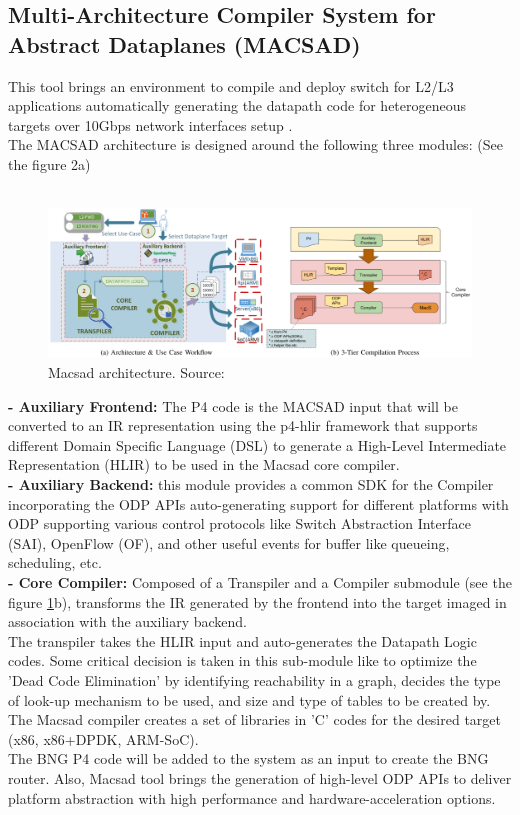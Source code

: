 \subsection{Multi-Architecture Compiler System for Abstract Dataplanes (MACSAD)} 
\label{sec:Macsad}
This tool brings an environment to compile and deploy switch for L2/L3 applications automatically generating the datapath code for heterogeneous targets over 10Gbps network interfaces setup \cite{Patra}.\\
The MACSAD architecture is designed around the following three modules: (See the figure 2a) \\ \\
\begin{figure}[!ht]
	\centering
	\includegraphics[width=0.85\linewidth]{figures/macsad_arch.png}
	\caption{Macsad architecture. Source:\cite{Patra}}
	\label{fig:mac_arch}
\end{figure}

\textbf{- Auxiliary Frontend:} The P4 code is the MACSAD input that will be converted to an IR representation using the  p4-hlir framework that supports different Domain Specific Language (DSL) to generate a High-Level Intermediate Representation (HLIR) to be used in the Macsad core compiler.\\
\textbf{- Auxiliary Backend:} this module provides a common SDK for the Compiler incorporating the ODP APIs 
 auto-generating support for different platforms with ODP supporting various control protocols like Switch Abstraction Interface (SAI), OpenFlow (OF), and other useful events for buffer like queueing, scheduling, etc.\\
\textbf{- Core Compiler:} Composed of a Transpiler and a Compiler submodule (see the figure \ref{fig:mac_arch}b), transforms the IR generated by the frontend into the target imaged in association with the auxiliary backend.\\
The transpiler takes the HLIR input and auto-generates the Datapath Logic codes. Some critical decision is taken in this sub-module like to optimize the ’Dead Code Elimination’ by identifying reachability in a graph, decides the type of look-up mechanism to be used, and size and type of tables to be created by. 
The Macsad compiler creates a set of libraries in 'C' codes for the desired target (x86, x86+DPDK, ARM-SoC).\\
The BNG P4 code will be added to the system as an input to create the BNG router. Also, Macsad tool brings the generation of high-level ODP APIs to deliver platform abstraction with high performance and hardware-acceleration options.



